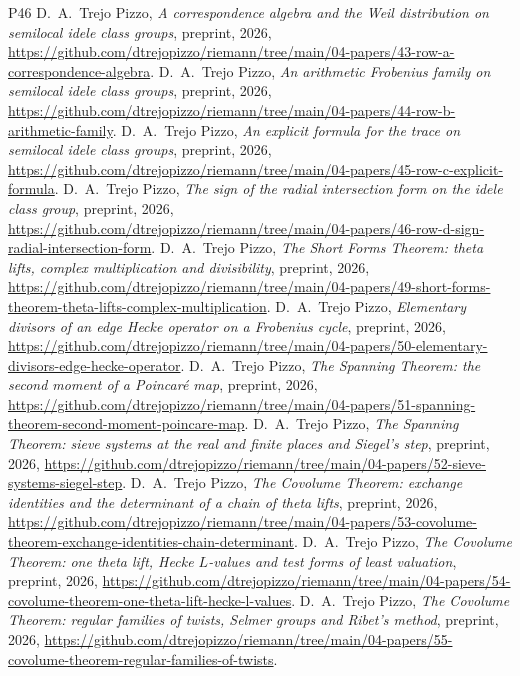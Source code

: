 \documentclass[10pt]{amsart}
\theoremstyle{definition}
\theoremstyle{remark}
\begin{document}
\begin{thebibliography}{P46}
 D.~A.~Trejo Pizzo,
\emph{A correspondence algebra and the Weil distribution on semilocal idele
class groups}, preprint, 2026, \url{https://github.com/dtrejopizzo/riemann/tree/main/04-papers/43-row-a-correspondence-algebra}.
 D.~A.~Trejo Pizzo,
\emph{An arithmetic Frobenius family on semilocal idele class groups},
preprint, 2026, \url{https://github.com/dtrejopizzo/riemann/tree/main/04-papers/44-row-b-arithmetic-family}.
 D.~A.~Trejo Pizzo, \emph{An explicit formula for the trace on semilocal idele class groups}, preprint, 2026, \url{https://github.com/dtrejopizzo/riemann/tree/main/04-papers/45-row-c-explicit-formula}.
 D.~A.~Trejo Pizzo, \emph{The sign of the radial intersection form on the idele class group}, preprint, 2026, \url{https://github.com/dtrejopizzo/riemann/tree/main/04-papers/46-row-d-sign-radial-intersection-form}.
 D.~A.~Trejo Pizzo, \emph{The Short Forms Theorem: theta lifts, complex multiplication and divisibility}, preprint, 2026, \url{https://github.com/dtrejopizzo/riemann/tree/main/04-papers/49-short-forms-theorem-theta-lifts-complex-multiplication}.
 D.~A.~Trejo Pizzo, \emph{Elementary divisors of an edge Hecke operator on a Frobenius cycle}, preprint, 2026, \url{https://github.com/dtrejopizzo/riemann/tree/main/04-papers/50-elementary-divisors-edge-hecke-operator}.
 D.~A.~Trejo Pizzo, \emph{The Spanning Theorem: the second moment of a Poincar\'e map}, preprint, 2026, \url{https://github.com/dtrejopizzo/riemann/tree/main/04-papers/51-spanning-theorem-second-moment-poincare-map}.
 D.~A.~Trejo Pizzo, \emph{The Spanning Theorem: sieve systems at the real and finite places and Siegel's step}, preprint, 2026, \url{https://github.com/dtrejopizzo/riemann/tree/main/04-papers/52-sieve-systems-siegel-step}.
 D.~A.~Trejo Pizzo, \emph{The Covolume Theorem: exchange identities and the determinant of a chain of theta lifts}, preprint, 2026, \url{https://github.com/dtrejopizzo/riemann/tree/main/04-papers/53-covolume-theorem-exchange-identities-chain-determinant}.
 D.~A.~Trejo Pizzo, \emph{The Covolume Theorem: one theta lift, Hecke $L$-values and test forms of least valuation}, preprint, 2026, \url{https://github.com/dtrejopizzo/riemann/tree/main/04-papers/54-covolume-theorem-one-theta-lift-hecke-l-values}.
 D.~A.~Trejo Pizzo, \emph{The Covolume Theorem: regular families of twists, Selmer groups and Ribet's method}, preprint, 2026, \url{https://github.com/dtrejopizzo/riemann/tree/main/04-papers/55-covolume-theorem-regular-families-of-twists}.

\end{thebibliography}
\end{document}
